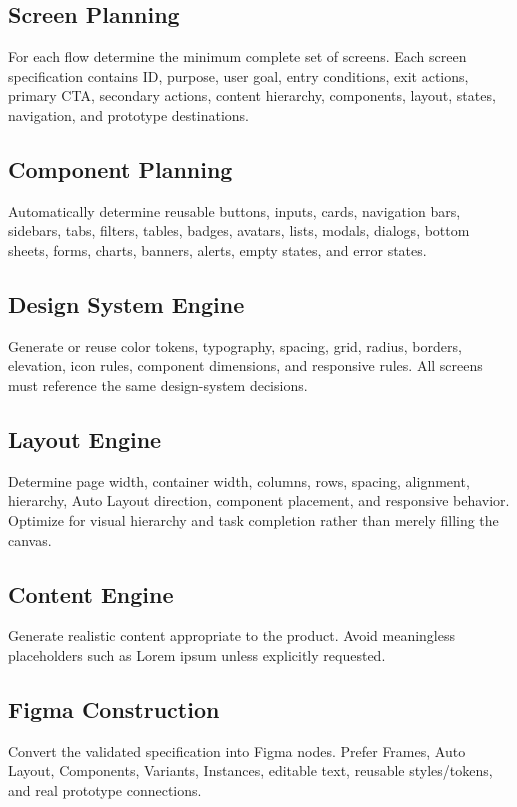 \documentclass[11pt,a4paper]{article}
\begin{document}
\subsection{Screen Planning}
For each flow determine the minimum complete set of screens. Each screen specification contains ID, purpose, user goal, entry conditions, exit actions, primary CTA, secondary actions, content hierarchy, components, layout, states, navigation, and prototype destinations.

\subsection{Component Planning}
Automatically determine reusable buttons, inputs, cards, navigation bars, sidebars, tabs, filters, tables, badges, avatars, lists, modals, dialogs, bottom sheets, forms, charts, banners, alerts, empty states, and error states.

\subsection{Design System Engine}
Generate or reuse color tokens, typography, spacing, grid, radius, borders, elevation, icon rules, component dimensions, and responsive rules. All screens must reference the same design-system decisions.

\subsection{Layout Engine}
Determine page width, container width, columns, rows, spacing, alignment, hierarchy, Auto Layout direction, component placement, and responsive behavior. Optimize for visual hierarchy and task completion rather than merely filling the canvas.

\subsection{Content Engine}
Generate realistic content appropriate to the product. Avoid meaningless placeholders such as Lorem ipsum unless explicitly requested.

\subsection{Figma Construction}
Convert the validated specification into Figma nodes. Prefer Frames, Auto Layout, Components, Variants, Instances, editable text, reusable styles/tokens, and real prototype connections.
\end{document}
